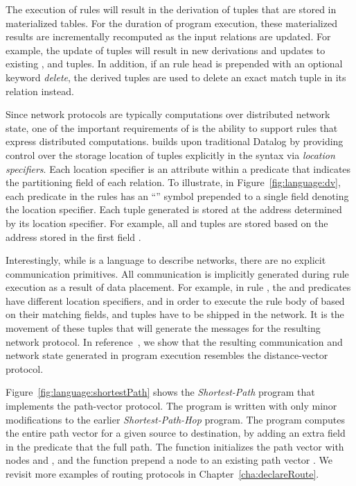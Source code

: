 The execution of \Lang rules will result in the derivation of tuples
that are stored in materialized tables. For the duration of program
execution, these materialized results are incrementally recomputed as
the input relations are updated. For example, the update of 
tuples will result in new derivations and updates to existing ,
 and  tuples. In addition, if an \Lang
rule head is prepended with an optional keyword {\em delete}, the
derived tuples are used to delete an exact match tuple in its relation
instead.

Since network protocols are typically computations over distributed
network state, one of the important requirements of \Lang is the ability
to support rules that express distributed computations. \Lang builds
upon traditional Datalog by providing control over the storage location
of tuples explicitly in the syntax via {\em location specifiers}. Each
location specifier is an attribute within a predicate that indicates the
partitioning field of each relation.  To illustrate, in
Figure~\ref{fig:language:dv}, each predicate in the \Lang rules has an
``'' symbol prepended to a single field denoting the location
specifier. Each tuple generated is stored at the address determined by
its location specifier. For example, all  and  tuples
are stored based on the address stored in the first field .

Interestingly, while \Lang is a language to describe networks, there are
no explicit communication primitives. All communication is implicitly
generated during rule execution as a result of data placement. For
example, in rule , the  and  predicates have
different location specifiers, and in order to execute the rule body of
 based on their matching fields,  and  tuples
have to be shipped in the network. It is the movement of these tuples
that will generate the messages for the resulting network protocol.  In
reference~\cite{declareRoute}, we show that the resulting communication
and network state generated in program execution resembles the
distance-vector protocol.

Figure~\ref{fig:language:shortestPath} shows the {\em Shortest-Path}
\Lang program that implements the path-vector protocol. The program is
written with only minor modifications to the earlier {\em
Shortest-Path-Hop} \Lang program. The program computes the entire path
vector for a given source to destination, by adding an extra
 field in the  predicate that the full path. The
function  initializes the path vector with nodes
 and , and the function  prepend a
node  to an existing path vector . We revisit more examples
of routing protocols in Chapter~\ref{cha:declareRoute}.

